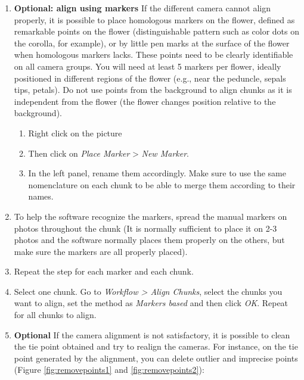 \documentclass[
]{book}
\begin{document}
\begin{enumerate}
\def\labelenumi{\arabic{enumi}.}
\setcounter{enumi}{4}
\item
  \textbf{Optional: align using markers} If the different camera cannot
  align properly, it is possible to place homologous markers on the
  flower, defined as remarkable points on the flower (distinguishable
  pattern such as color dots on the corolla, for example), or by
  little pen marks at the surface of the flower when homologous
  markers lacks. These points need to be clearly identifiable on all
  camera groups. You will need at least 5 markers per flower, ideally
  positioned in different regions of the flower (e.g., near the
  peduncle, sepals tips, petals). Do not use points from the
  background to align chunks as it is independent from the flower (the
  flower changes position relative to the background).

  \begin{enumerate}
  \def\labelenumii{\arabic{enumii}.}
  \item
    Right click on the picture
  \item
    Then click on \emph{Place Marker} \textgreater{} \emph{New Marker}.
  \item
    In the left panel, rename them accordingly. Make sure to use the
    same nomenclature on each chunk to be able to merge them
    according to their names.
  \end{enumerate}
\item
  To help the software recognize the markers, spread the manual
  markers on photos throughout the chunk (It is normally sufficient to
  place it on 2-3 photos and the software normally places them
  properly on the others, but make sure the markers are all properly
  placed).
\item
  Repeat the step for each marker and each chunk.
\item
  Select one chunk. Go to \emph{Workflow \textgreater{} Align Chunks}, select the
  chunks you want to align, set the method as \emph{Markers based} and then
  click \emph{OK}. Repeat for all chunks to align.
\item
  \textbf{Optional} If the camera alignment is not satisfactory, it is
  possible to clean the tie point obtained and try to realign the
  cameras. For instance, on the tie point generated by the alignment,
  you can delete outlier and imprecise points (Figure \ref{fig:removepoints1} and \ref{fig:removepoints2}):


\end{enumerate}
\end{document}
